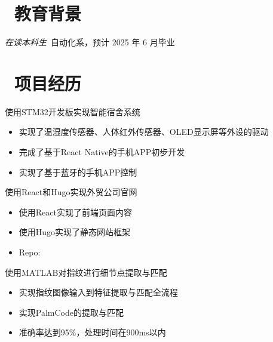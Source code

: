 \documentclass{resume}
\begin{document}


 
\section{\faGraduationCap\  教育背景}
\textit{在读本科生}\ 自动化系，预计 2025 年 6 月毕业

\section{\faUsers\ 项目经历}

\begin{onehalfspacing}
使用STM32开发板实现智能宿舍系统
\begin{itemize}
  \item 实现了温湿度传感器、人体红外传感器、OLED显示屏等外设的驱动
  \item 完成了基于React Native的手机APP初步开发
  \item 实现了基于蓝牙的手机APP控制
\end{itemize}
\end{onehalfspacing}

\begin{onehalfspacing}
使用React和Hugo实现外贸公司官网
\begin{itemize}
  \item 使用React实现了前端页面内容
  \item 使用Hugo实现了静态网站框架
  \item Repo: 
\end{itemize}
\end{onehalfspacing}

\begin{onehalfspacing}
使用MATLAB对指纹进行细节点提取与匹配
\begin{itemize}
  \item 实现指纹图像输入到特征提取与匹配全流程
  \item 实现PalmCode的提取与匹配
  \item 准确率达到95\%，处理时间在900ms以内
\end{itemize}
\end{onehalfspacing}
\end{document}
